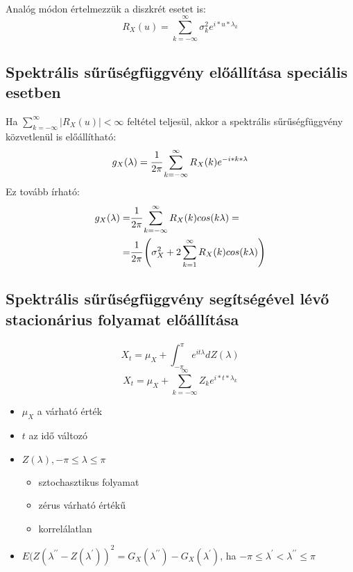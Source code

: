\documentclass[11pt,a4paper]{article}
\begin{document}
			\paragraph{}
				Analóg módon értelmezzük a diszkrét esetet is:
				$$R_X(u) = \sum_{k = - \infty}^\infty \sigma^2_k e^{i*u* \lambda_k}$$
			\subsection{Spektrális sűrűségfüggvény előállítása speciális esetben}
				Ha $\sum_{k=- \infty}^{\infty}|R_X(u)| < \infty$ feltétel teljesül, akkor a spektrális sűrűségfüggvény közvetlenül is előállítható:
				$$g_X(\lambda) = \cfrac{1}{2 \pi} \sum_{k = - \infty} ^{\infty} R_X(k) e^{-i * k *\lambda}$$
				Ez tovább írható:
				$$
				\begin{aligned}
					g_X(\lambda) =& \cfrac{1}{ 2  \pi} \sum_{k = - \infty}^{\infty}R_X(k)cos(k \lambda) = \\
					=& \cfrac{1}{2 \pi} \left( \sigma_X^2 + 2 \sum_{k = 1}^{\infty} R_X(k) cos(k \lambda) \right)
				\end{aligned}$$
			\subsection{Spektrális sűrűségfüggvény segítségével lévő stacionárius folyamat előállítása}
				\paragraph{}
					$$X_t = \mu_X + \int_{- \pi} ^\pi e^{it\lambda} d Z(\lambda)$$
					$$X_t = \mu_X + \sum_{k=-\infty}^{\infty}Z_ke^{i*t*\lambda_k}$$
					\begin{itemize}
						\item $\mu_X$ a várható érték
						\item $t$ az idő változó
						\item $Z(\lambda), -\pi \le \lambda \le \pi$
							\begin{itemize}
								\item sztochasztikus folyamat
								\item zérus várható értékű
								\item korrelálatlan
							\end{itemize}
						\item $E(Z(\lambda^{\prime\prime} - Z(\lambda^{\prime}))^2 = G_X(\lambda^{\prime \prime}) -G_X(\lambda^{\prime})$, ha $-\pi \le \lambda^{\prime} < \lambda^{\prime \prime} \le \pi$ 
					\end{itemize}
\end{document}
